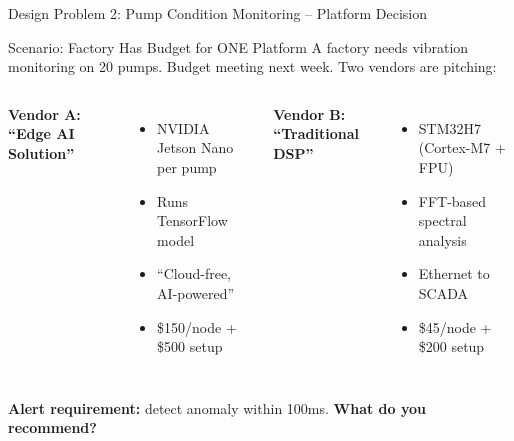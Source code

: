 \documentclass[aspectratio=169,11pt]{beamer}
\begin{document}
\begin{frame}{Design Problem 2: Pump Condition Monitoring -- Platform Decision}
    \begin{block}{Scenario: Factory Has Budget for ONE Platform}
        A factory needs vibration monitoring on 20 pumps. Budget meeting next week. Two vendors are pitching:
        
        \vspace{0.2cm}
        \begin{columns}
            \textbf{Vendor A: ``Edge AI Solution''}
            \begin{itemize}
                \item NVIDIA Jetson Nano per pump
                \item Runs TensorFlow model
                \item ``Cloud-free, AI-powered''
                \item \$150/node + \$500 setup
            \end{itemize}
            
            \textbf{Vendor B: ``Traditional DSP''}
            \begin{itemize}
                \item STM32H7 (Cortex-M7 + FPU)
                \item FFT-based spectral analysis
                \item Ethernet to SCADA
                \item \$45/node + \$200 setup
            \end{itemize}
        \end{columns}
        
        \vspace{0.2cm}
        \textbf{Alert requirement:} detect anomaly within 100ms. \textbf{What do you recommend?}
    \end{block}
\end{frame}
\end{document}
